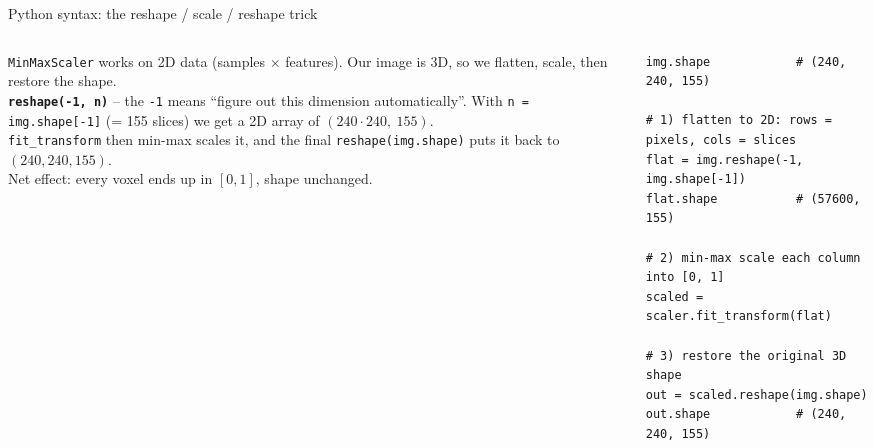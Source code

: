\documentclass[10pt,aspectratio=169]{beamer}
\renewcommand{\section}[2][]{}
\begin{document}
\begin{frame}[fragile]{Python syntax: the reshape / scale / reshape trick}
\begin{columns}[T,onlytextwidth]
\begin{column}{0.42\textwidth}
\small
\texttt{MinMaxScaler} works on 2D data (samples $\times$ features). Our image is 3D, so we
flatten, scale, then restore the shape.\\[0.4em]
\textbf{\texttt{reshape(-1, n)}} -- the \texttt{-1} means ``figure out this dimension
automatically''. With \texttt{n = img.shape[-1]} (= 155 slices) we get a 2D array of
$(240\!\cdot\!240,\ 155)$.\\[0.4em]
\texttt{fit\_transform} then min-max scales it, and the final \texttt{reshape(img.shape)} puts it
back to $(240, 240, 155)$.\\[0.4em]
Net effect: every voxel ends up in $[0,1]$, shape unchanged.
\end{column}
\begin{column}{0.56\textwidth}
\begin{lstlisting}[stepnumber=0]
img.shape            # (240, 240, 155)

# 1) flatten to 2D: rows = pixels, cols = slices
flat = img.reshape(-1, img.shape[-1])
flat.shape           # (57600, 155)

# 2) min-max scale each column into [0, 1]
scaled = scaler.fit_transform(flat)

# 3) restore the original 3D shape
out = scaled.reshape(img.shape)
out.shape            # (240, 240, 155)
\end{lstlisting}
\end{column}
\end{columns}
\end{frame}

\section{Exploring the data}
\end{document}
